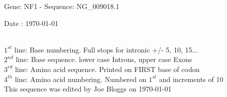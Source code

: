 \documentclass{article}
\begin{document}
\renewcommand{\footrulewidth}{1pt}
\renewcommand{\headrulewidth}{0pt}
\begin{center}
\begin{large}
 Gene: NF1 - Sequence: NG\_009018.1
 
 Date : \today\\\\
\end{large}
\end{center}
$1^{st}$ line: Base numbering. Full stops for intronic +/- 5, 10, 15...\\
$2^{nd}$ line: Base sequence. lower case Introns, upper case Exons\\
$3^{rd}$ line: Amino acid sequence. Printed on FIRST base of codon\\
$4^{th}$ line: Amino acid numbering. Numbered on $1^{st}$ and increments of 10\\
This sequence was edited by Joe Bloggs on \today
\end{document}
